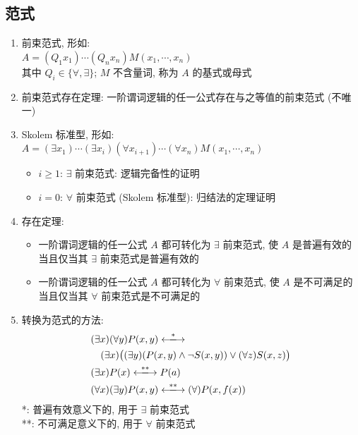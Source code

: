 \documentclass[11pt,a4paper,twocolumn,fleqn]{article} %
\begin{document}
\subsection{范式} %
\label{sub:forming}
\begin{enumerate}
	\item 前束范式, 形如: \\
	$A = (Q_1 x_1)\cdots(Q_n x_n)M(x_1, \cdots, x_n)$\\
	其中 $Q_i\in\{\forall, \exists\}$; $M$ 不含量词, 称为 $A$ 的基式或母式
	\item 前束范式存在定理: 一阶谓词逻辑的任一公式存在与之等值的前束范式 (不唯一)
	\item Skolem 标准型, 形如: \\
	$A = (\exists x_1)\cdots(\exists x_i)(\forall x_{i+1})\cdots(\forall x_n)
	M(x_1,\cdots, x_n)$
	\begin{itemize}
		\item $i\ge 1$: $\exists$ 前束范式: 逻辑完备性的证明
		\item $i = 0$: $\forall$ 前束范式 (Skolem 标准型): 归结法的定理证明
	\end{itemize}
	\item 存在定理: 
	\begin{itemize}
		\item 一阶谓词逻辑的任一公式 $A$ 都可转化为 $\exists$ 前束范式, 
		使 $A$ 是普遍有效的当且仅当其 $\exists$ 前束范式是普遍有效的
		\item 一阶谓词逻辑的任一公式 $A$ 都可转化为 $\forall$ 前束范式, 
		使 $A$ 是不可满足的当且仅当其 $\forall$ 前束范式是不可满足的
	\end{itemize}
	\item 转换为范式的方法: 
	\begin{align*}
		&  (\exists x)(\forall y) P(x, y)\xlongleftrightarrow{*}\\
		& \quad(\exists x)\big((\exists y) (P(x, y)\land \lnot S(x, y)
		)\lor(\forall z)S(x, z)\big) \\
		& (\exists x) P(x) \xlongleftrightarrow{**} P(a) \\
		& (\forall x)(\exists y) P(x, y) \xlongleftrightarrow{**} 
		(\forall)P(x, f(x)) 
	\end{align*}
	*: 普遍有效意义下的, 用于 $\exists$ 前束范式\\
	**: 不可满足意义下的, 用于 $\forall$ 前束范式
\end{enumerate}
\end{document}
